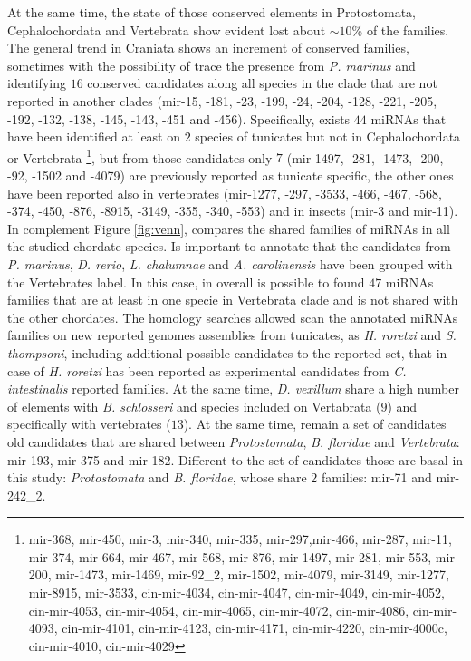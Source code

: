 \documentclass[11pt]{article}
\begin{document}
At the same time, the state of those conserved elements in Protostomata, 
Cephalochordata and Vertebrata show evident lost about $\sim 10$\% of the 
families.
The general trend in Craniata shows an increment of conserved 
families, sometimes with the possibility of trace the presence from \textit{P. 
marinus} and identifying $16$ conserved candidates along all species in the 
clade that are not reported in another clades (mir-15, -181, -23, -199, 
-24, -204, -128, -221, -205, -192, -132, -138, -145, -143, -451 and 
-456). Specifically, exists $44$ miRNAs that have been identified at least 
on $2$ species of tunicates but not in Cephalochordata or 
Vertebrata \footnote{mir-368, mir-450, mir-3, mir-340, mir-335, 
mir-297,mir-466, mir-287, mir-11, mir-374, mir-664, mir-467, mir-568, mir-876, 
mir-1497, mir-281, mir-553, mir-200, mir-1473, mir-1469, mir-92\_2, mir-1502, 
mir-4079, mir-3149, mir-1277, mir-8915, mir-3533, cin-mir-4034, cin-mir-4047, 
cin-mir-4049, cin-mir-4052, cin-mir-4053, cin-mir-4054, 
cin-mir-4065, cin-mir-4072, cin-mir-4086, cin-mir-4093, 
cin-mir-4101, cin-mir-4123, cin-mir-4171, cin-mir-4220, 
cin-mir-4000c, cin-mir-4010, cin-mir-4029}, but from those candidates only $7$ 
(mir-1497, -281, -1473, -200, -92, -1502 and -4079) are previously reported as 
tunicate specific, the other ones have been reported also in vertebrates 
(mir-1277, -297, -3533, -466, -467, -568, -374, -450, -876, -8915, -3149, -355, 
-340, -553) and in insects (mir-3 and mir-11). In complement Figure 
\ref{fig:venn}, compares the shared families of miRNAs in all the studied 
chordate species. Is important to annotate that the candidates from \textit{P. 
marinus}, \textit{D. rerio}, \textit{L. chalumnae} and \textit{A. carolinensis} 
have been grouped with the Vertebrates label. In this case, in overall is 
possible to found $47$ miRNAs families that are at least in one specie in 
Vertebrata clade and is not shared with the other chordates. The homology 
searches allowed scan the annotated miRNAs families on new reported genomes 
assemblies from tunicates, as \textit{H. roretzi} and \textit{S. thompsoni}, 
including additional possible candidates to the reported set, that in case of 
\textit{H. roretzi} has been reported as experimental candidates from 
\textit{C. intestinalis} reported families. At the same time, \textit{D. 
vexillum} share a high number of elements with \textit{B. schlosseri} and 
species included on Vertabrata ($9$) and specifically with vertebrates ($13$). 
At the same time, remain a set of candidates old candidates that are shared 
between \textit{Protostomata}, \textit{B. floridae} and \textit{Vertebrata}: 
mir-193, mir-375 and mir-182. Different to the set of candidates those are 
basal in this study: \textit{Protostomata} and \textit{B. floridae}, whose 
share $2$ families: mir-71 and mir-242\_2.
\end{document}
